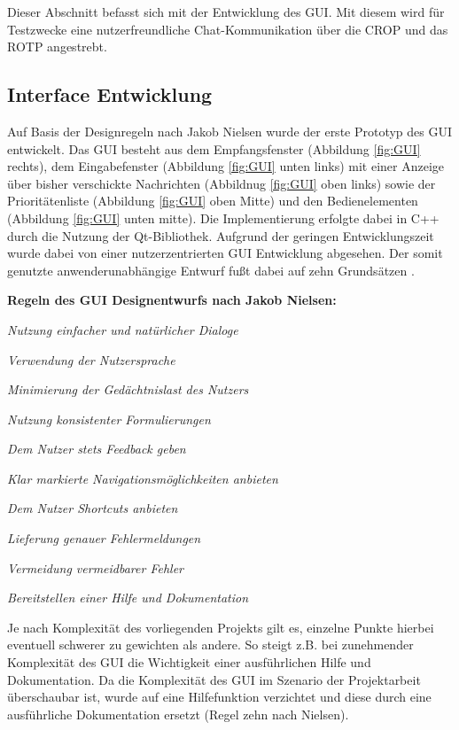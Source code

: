 \label{cap:chatGui}

Dieser Abschnitt befasst sich mit der Entwicklung des \gls{GUI}. Mit diesem
wird für Testzwecke eine nutzerfreundliche Chat-Kommunikation über die
\gls{CROP} und das \gls{ROTP} angestrebt.

\subsection{Interface Entwicklung}
Auf Basis der Designregeln nach Jakob Nielsen wurde der
erste Prototyp des GUI entwickelt.
\newline Das GUI besteht aus dem Empfangsfenster (Abbildung
\ref{fig:GUI} rechts), dem Eingabefenster (Abbildung \ref{fig:GUI}
unten links) mit einer Anzeige über bisher verschickte Nachrichten
(Abbildnug \ref{fig:GUI} oben links) sowie der Priorit{\"a}tenliste
(Abbildung \ref{fig:GUI} oben Mitte) und den Bedienelementen (Abbildung
\ref{fig:GUI} unten mitte). Die Implementierung erfolgte dabei in C++
durch die Nutzung der Qt-Bibliothek. Aufgrund der geringen Entwicklungszeit
wurde dabei von einer nutzerzentrierten \gls{GUI} Entwicklung abgesehen. Der
somit genutzte anwenderunabh{\"a}ngige Entwurf fu{\ss}t dabei auf zehn
Grunds{\"a}tzen \cite{Nielsen}.

\textbf{Regeln des \gls{GUI} Designentwurfs nach Jakob Nielsen:}

   \begin{compactenum}[I]
     \item \textit{Nutzung einfacher und nat{\"u}rlicher Dialoge}
     \item \textit{Verwendung der Nutzersprache}
     \item \textit{Minimierung der Ged{\"a}chtnislast des Nutzers}
     \item \textit{Nutzung konsistenter Formulierungen}
     \item \textit{Dem Nutzer stets Feedback geben}
     \item \textit{Klar markierte Navigationsm{\"o}glichkeiten anbieten}
     \item \textit{Dem Nutzer Shortcuts anbieten}
     \item \textit{Lieferung genauer Fehlermeldungen}
     \item \textit{Vermeidung vermeidbarer Fehler}
     \item \textit{Bereitstellen einer Hilfe und Dokumentation}
   \end{compactenum}
   \label{Nielsen}

Je nach Komplexit{\"a}t des vorliegenden Projekts gilt es, einzelne Punkte
hierbei eventuell schwerer zu gewichten als andere. So steigt z.B. bei
zunehmender Komplexit{\"a}t des \gls{GUI} die Wichtigkeit einer ausf{\"u}hrlichen
Hilfe und Dokumentation. Da die Komplexit{\"a}t des \gls{GUI} im Szenario der
Projektarbeit {\"u}berschaubar ist, wurde auf eine Hilfefunktion verzichtet
und diese durch eine ausf{\"u}hrliche Dokumentation ersetzt (Regel zehn nach
Nielsen).

